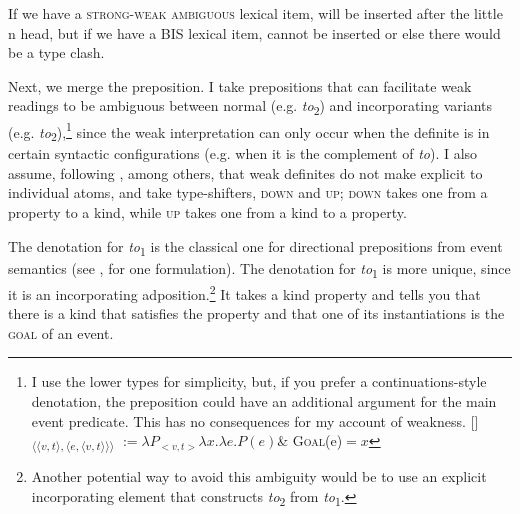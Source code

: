 \documentclass[output=paper,
modfonts
]{langscibook}
\begin{document}
If we have a \textsc{strong-weak ambiguous} lexical item,  will be inserted after the little n head, but if we have a BIS lexical item,  cannot be inserted or else there would be a type clash. 

Next, we merge the preposition. I take prepositions that can facilitate weak readings  to be ambiguous between normal (e.g. \textit{to}\textsubscript{2}) and incorporating variants (e.g. \textit{to}\textsubscript{2}),\footnote{I use the lower types for simplicity, but, if you prefer a continuations-style denotation, the preposition could have an additional argument for the main event predicate. This has no consequences for my account of weakness.
\ea \textnormal{[\!]\textsubscript{$\langle \langle v,t \rangle,\langle e,\langle v,t\rangle \rangle \rangle$} $:= \lambda P_{<v,t>} \lambda x. \lambda e.P(e) $\& \textsc{Goal}(e)$=x $}
\z\vspace*{-\baselineskip}} since the weak interpretation can only occur when the definite is in certain syntactic configurations (e.g. when it is the complement of \textit{to}). I also assume, following \citet{Aguilar-Guevara2014}, among others, that weak definites do not make explicit  to individual atoms, and take  type-shifters, \textsc{down} and \textsc{up}; \textsc{down} takes one from a property to a kind, while \textsc{up} takes one from a kind to a property. 

\begin{exe} 
\end{exe}

The denotation for \textit{to}\textsubscript{1} is the classical one for directional prepositions from event semantics (see \citealt[57]{Champollion2017}, for one formulation). The denotation for \textit{to}\textsubscript{1} is more unique, since it is an incorporating adposition.\footnote{Another potential way to avoid this ambiguity would be to use an explicit incorporating element that constructs \textit{to}\textsubscript{2} from \textit{to}\textsubscript{1}.} It takes a kind property and tells you that there is a kind that satisfies the property and that one of its instantiations is the \textsc{goal} of an event.
\end{document}
